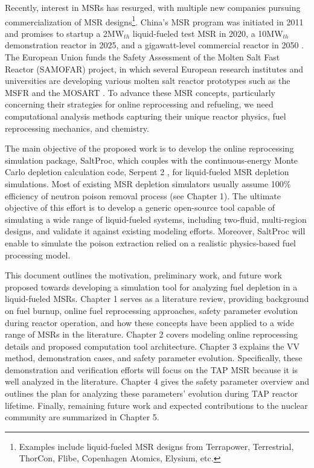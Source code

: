 Recently, interest in \glspl{MSR} has resurged, with multiple new companies 
pursuing commercialization of \gls{MSR} designs\footnote{Examples 
include liquid-fueled \gls{MSR} designs from Terrapower, Terrestrial, 
ThorCon, Flibe, Copenhagen Atomics, Elysium, etc.}. China's \gls{MSR} program 
was initiated in 2011 and promises to startup a 2MW$_{th}$ 
liquid-fueled test \gls{MSR} in 2020, a 10MW$_{th}$ 
demonstration reactor in 2025, and a gigawatt-level 
commercial reactor in 2050 \cite{zhang_review_2018}. The European 
Union funds the Safety Assessment of the Molten Salt Fast Reactor 
(SAMOFAR) project, in which several European research institutes and 
universities are developing various molten salt reactor prototypes 
such as the \gls{MSFR} \cite{fiorina_molten_2013} and the \gls{MOSART} 
\cite{ignatiev_molten_2014}. To advance these \gls{MSR} concepts, particularly 
concerning their strategies for online reprocessing and refueling, 
we need computational analysis methods capturing their unique reactor physics, 
fuel reprocessing mechanics, and chemistry. 

The main objective of the proposed work is to develop the online 
reprocessing simulation package, SaltProc, which couples with the 
continuous-energy Monte Carlo depletion calculation code, Serpent 2 
\cite{leppanen_serpent_2014}, for liquid-fueled \gls{MSR} depletion 
simulations. Most of existing \gls{MSR} depletion simulators usually assume 100\% 
efficiency of neutron poison removal process (see Chapter 1). The ultimate 
objective of this effort is to develop a generic open-source tool capable of 
simulating a wide range of liquid-fueled systems, including two-fluid, 
multi-region designs, and validate it against existing modeling efforts. 
Moreover, SaltProc will enable to simulate the poison extraction relied on a 
realistic physics-based fuel processing model.

This document outlines the motivation, preliminary work, and future work 
proposed towards developing a simulation tool for analyzing fuel depletion in 
a liquid-fueled \glspl{MSR}. Chapter 1 serves as a literature review, 
providing background on fuel burnup, online fuel reprocessing approaches, 
safety parameter evolution during reactor operation, and how these 
concepts have been applied to a wide range of \glspl{MSR} in the literature. 
Chapter 2 covers modeling online reprocessing details and proposed computation 
tool architecture. Chapter 3 explains the \gls{VV} method, demonstration 
cases, and safety parameter evolution. Specifically, these demonstration and 
verification efforts will focus on the \gls{TAP} \gls{MSR} because it is well 
analyzed in the literature. Chapter 4 gives the safety parameter overview and 
outlines the plan for analyzing these parameters' evolution during \gls{TAP} 
reactor lifetime. Finally, remaining future work and expected contributions to 
the nuclear community are summarized in Chapter 5.

